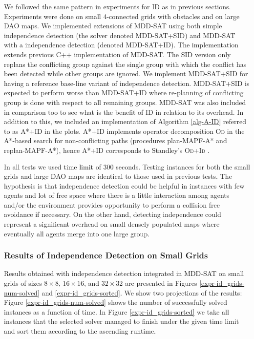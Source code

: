 \documentclass[jair,oneside,11pt]{article}
\begin{document}
We followed the same pattern in experiments for ID as in previous sections. Experiments were done on small 4-connected grids with obstacles and on large DAO maps. We implemented extensions of MDD-SAT using both simple independence detection (the solver denoted MDD-SAT+SID) and MDD-SAT with a independence detection (denoted MDD-SAT+ID). The implementation extends previous C++ implementation of MDD-SAT. The SID version only replans the conflicting group against the single group with which the conflict has been detected while other groups are ignored. We implement MDD-SAT+SID for having a reference base-line variant of independence detection. MDD-SAT+SID is expected to perform worse than MDD-SAT+ID where re-planning of conflicting group is done with respect to all remaining groups. MDD-SAT was also included in comparison too to see what is the benefit of ID in relation to its overhead. In addition to this, we included an implementation of Algorithm \ref{alg-A-ID} referred to as A*+ID in the plots. A*+ID implements operator decomposition \textsc{Od} in the A*-based search for non-conflicting paths (procedures plan-MAPF-A* and replan-MAPF-A*), hence A*+ID corresponds to Standley's \textsc{Od+Id} \cite{standley2010finding}.

In all tests we used time limit of 300 seconds. Testing instances for both the small grids and large DAO maps are identical to those used in previous tests. The hypothesis is that independence detection could be helpful in instances with few agents and lot of free space where there is a little interaction among agents and/or the environment provides opportunity to perform a collision free avoidance if necessary. On the other hand, detecting independence could represent a significant overhead on small densely populated maps where eventually all agents merge into one large group.

\subsubsection{Results of Independence Detection on Small Grids}

Results obtained with independence detection integrated in MDD-SAT on small grids of sizes $8{}\times{}8$, $16{}\times{}16$, and $32{}\times{}32$ are presented in Figures \ref{expr-id_grids-num-solved} and \ref{expr-id_grids-sorted}. We show two projections of the results: Figure \ref{expr-id_grids-num-solved} shows the number of successfully solved instances as a function of time. In Figure \ref{expr-id_grids-sorted} we take all instances that the selected solver managed to finish under the given time limit and sort them according to the ascending runtime.
\end{document}
